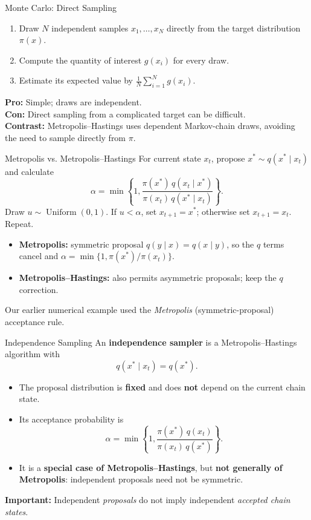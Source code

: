\documentclass[aspectratio=43,11pt]{beamer}
\begin{document}
\begin{frame}{Monte Carlo: Direct Sampling}
\small
\begin{enumerate}
\item Draw $N$ independent samples $x_1,\ldots,x_N$ directly from the target distribution $\pi(x)$.
\item Compute the quantity of interest $g(x_i)$ for every draw.
\item Estimate its expected value by $\frac{1}{N}\sum_{i=1}^N g(x_i)$.
\end{enumerate}
\vspace{0.3cm}
\textbf{Pro:} Simple; draws are independent.\\[0.2cm]
\textbf{Con:} Direct sampling from a complicated target can be difficult.\\[0.3cm]
\textbf{Contrast:} Metropolis--Hastings uses dependent Markov-chain draws, avoiding the need to sample directly from $\pi$.
\end{frame}

\begin{frame}{Metropolis vs. Metropolis--Hastings}
\small
For current state $x_t$, propose $x^*\sim q(x^*\mid x_t)$ and calculate
\[
\alpha=\min\!\left\{1,\frac{\pi(x^*)\,q(x_t\mid x^*)}{\pi(x_t)\,q(x^*\mid x_t)}\right\}.
\]
Draw $u\sim\operatorname{Uniform}(0,1)$. If $u<\alpha$, set $x_{t+1}=x^*$; otherwise set $x_{t+1}=x_t$. Repeat.
\vspace{0.25cm}
\begin{itemize}
\item \textbf{Metropolis:} symmetric proposal $q(y\mid x)=q(x\mid y)$, so the $q$ terms cancel and $\alpha=\min\{1,\pi(x^*)/\pi(x_t)\}$.
\item \textbf{Metropolis--Hastings:} also permits asymmetric proposals; keep the $q$ correction.
\end{itemize}
\vspace{0.15cm}
Our earlier numerical example used the \emph{Metropolis} (symmetric-proposal) acceptance rule.
\end{frame}

\begin{frame}{Independence Sampling}
\small
An \textbf{independence sampler} is a Metropolis--Hastings algorithm with
\[
q(x^*\mid x_t)=q(x^*).
\]
\begin{itemize}
\item The proposal distribution is \textbf{fixed} and does \textbf{not} depend on the current chain state.
\item Its acceptance probability is
\[
\alpha=\min\!\left\{1,\frac{\pi(x^*)\,q(x_t)}{\pi(x_t)\,q(x^*)}\right\}.
\]
\item It is a \textbf{special case of Metropolis--Hastings}, but \textbf{not generally of Metropolis}: independent proposals need not be symmetric.
\end{itemize}
\textbf{Important:} Independent \emph{proposals} do not imply independent \emph{accepted chain states}.
\end{frame}
\end{document}

